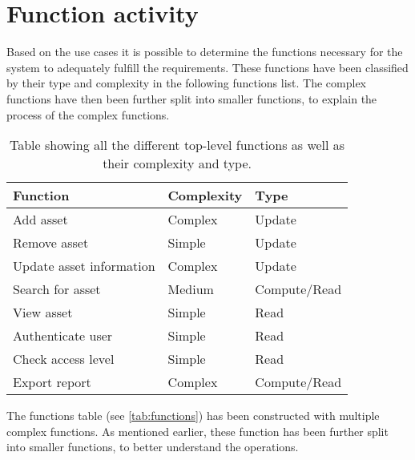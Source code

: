 \section{Function activity}\label{sc:function}
Based on the use cases it is possible to determine the functions necessary for the system to adequately fulfill the requirements. These functions have been classified by their type and complexity in the following functions list. The complex functions have then been further split into smaller functions, to explain the process of the complex functions.



\vspace{0.5cm}

\begin{table}[H]
\centering
    \begin{tabular}{|l|l|l|}
        \hline
        \textbf{Function} & \textbf{Complexity} & \textbf{Type} \\
        \hline
        \hline
        Add asset & Complex & Update\\
        \hline
        Remove asset & Simple & Update\\
        \hline
        Update asset information & Complex & Update\\
        \hline
        Search for asset & Medium & Compute/Read\\
        \hline
        View asset & Simple & Read\\
        \hline
        Authenticate user & Simple & Read\\
        \hline
        Check access level & Simple & Read\\
        \hline
        Export report & Complex & Compute/Read\\
        \hline
    \end{tabular}
\caption{Table showing all the different top-level functions as well as their complexity and type.}\label{tab:functions}
\end{table}

\vspace{0.5cm}

The functions table (see \autoref{tab:functions}) has been constructed with multiple complex functions. As mentioned earlier, these function has been further split into smaller functions, to better understand the operations. 


